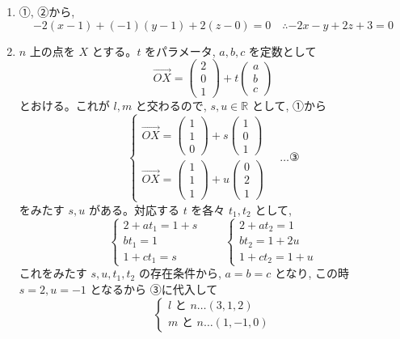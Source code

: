 \documentclass[../main.tex]{subfiles}
\begin{document}
\begin{enumerate}
  \item[(1)] ①, ②から,
    \[
      -2(x-1) + (-1)(y-1) + 2(z-0) = 0 \quad \therefore -2x-y+2z+3 = 0
    \]

  \item[(2)] $n$ 上の点を $X$ とする。$t$ をパラメータ, $a, b, c$ を定数として
    \[
      \overrightarrow{OX} =
      \begin{pmatrix} 2 \\ 0 \\ 1
      \end{pmatrix} + t
      \begin{pmatrix} a \\ b \\ c
      \end{pmatrix}
    \]
    とおける。これが $l, m$ と交わるので, $s, u \in \mathbb{R}$ として, ①から
    \[
      \begin{cases}
        \overrightarrow{OX} =
        \begin{pmatrix} 1 \\ 1 \\ 0
        \end{pmatrix} + s
        \begin{pmatrix} 1 \\ 0 \\ 1
        \end{pmatrix} \\
        \overrightarrow{OX} =
        \begin{pmatrix} 1 \\ 1 \\ 1
        \end{pmatrix} + u
        \begin{pmatrix} 0 \\ 2 \\ 1
        \end{pmatrix}
      \end{cases}
      \quad \dots \text{③}
    \]
    をみたす $s, u$ がある。対応する $t$ を各々 $t_1, t_2$ として,
    \[
      \begin{cases}
        2 + at_1 = 1 + s \\
        bt_1 = 1 \\
        1 + ct_1 = s
      \end{cases}
      \qquad
      \begin{cases}
        2 + at_2 = 1 \\
        bt_2 = 1 + 2u \\
        1 + ct_2 = 1 + u
      \end{cases}
    \]
    これをみたす $s, u, t_1, t_2$ の存在条件から, $a = b = c$ となり, この時 $s = 2, u = -1$ となるから ③に代入して
    \[
      \begin{cases}
        l \text{ と } n \dots (3,1,2) \\
        m \text{ と } n \dots (1,-1,0)
      \end{cases}
    \]
\end{enumerate}
\end{document}

